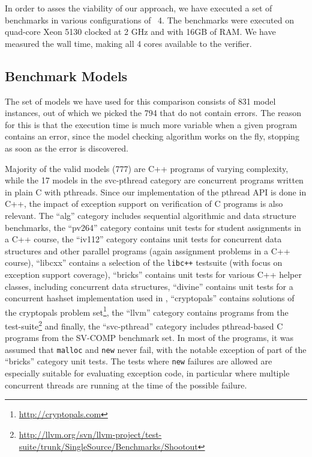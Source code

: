 In order to asses the viability of our approach, we have executed a set
of benchmarks in various configurations of \divine{}~4. The benchmarks were
executed on quad-core Xeon 5130 clocked at 2 GHz and with 16GB of RAM.
We have measured the wall time, making all 4 cores available to the
verifier.

\subsection{Benchmark Models}\label{benchmark-models}

The set of models we have used for this comparison consists of 831 model
instances, out of which we picked the 794 that do not contain errors.
The reason for this is that the execution time is much more variable
when a given program contains an error, since the model checking
algorithm works on the fly, stopping as soon as the error is discovered.

Majority of the valid models (777) are C++ programs of varying
complexity, while the 17 models in the svc-pthread category are
concurrent programs written in plain C with pthreads. Since our
implementation of the pthread API is done in C++, the impact of
exception support on verification of C programs is also relevant. The
``alg'' category includes sequential algorithmic and data structure
benchmarks, the ``pv264'' category contains unit tests for student
assignments in a C++ course, the ``iv112'' category contains unit tests
for concurrent data structures and other parallel programs (again
assignment problems in a C++ course), ``libcxx'' contains a selection of
the \texttt{libc++} testsuite (with focus on exception support
coverage), ``bricks'' contains unit tests for various C++ helper
classes, including concurrent data structures, ``divine'' contains unit
tests for a concurrent hashset implementation used in \divine{},
``cryptopals'' contains solutions of the cryptopals problem
set\footnote{\url{http://cryptopals.com}}, the ``llvm'' category
contains programs from the \llvm{} test-suite\footnote{\url{http://llvm.org/svn/llvm-project/test-suite/trunk/SingleSource/Benchmarks/Shootout}}
and finally, the ``svc-pthread'' category includes pthread-based C
programs from the SV-COMP benchmark set. In most of the programs, it was
assumed that \texttt{malloc} and \texttt{new} never fail, with the
notable exception of part of the ``bricks'' category unit tests. The
tests where \texttt{new} failures are allowed are especially suitable
for evaluating exception code, in particular where multiple concurrent
threads are running at the time of the possible failure.

